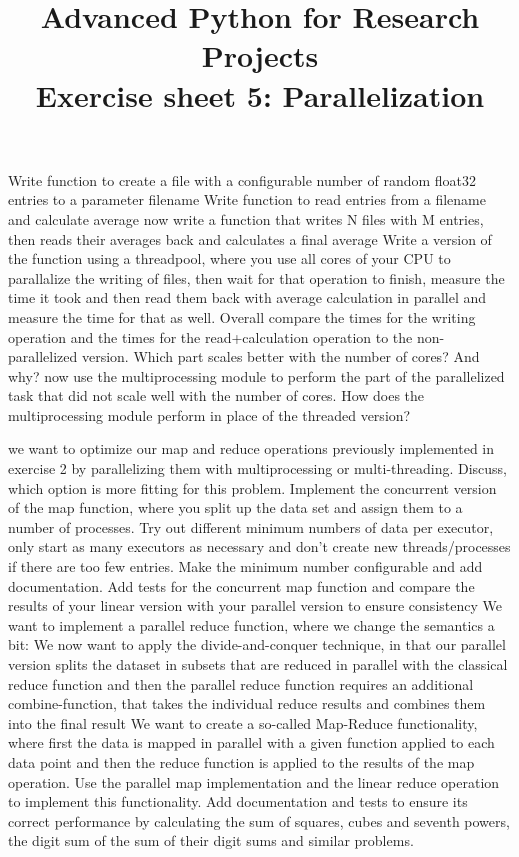 \documentclass[]{erlangen-problemset}
\title{{\Large Advanced Python for Research Projects} \\[0.3cm] 
Exercise sheet 5: Parallelization}
\begin{document}


\begin{problem}[title={Parallelization in python}]
\noindent
\Question Write function to create a file with a configurable number of random float32 entries to a parameter filename
\Question Write function to read entries from a filename and calculate average
\Question now write a function that writes N files with M entries, then reads their averages back and calculates a final average
\Question Write a version of the function using a threadpool, where you use all cores of your CPU to parallalize the writing of files, then wait for that operation to finish, measure the time it took and then read them back with average calculation in parallel and measure the time for that as well. 
Overall compare the times for the writing operation and the times for the read+calculation operation to the non-parallelized version. Which part scales better with the number of cores? And why?
\Question now use the multiprocessing module to perform the part of the parallelized task that did not scale well with the number of cores.
\Question How does the multiprocessing module perform in place of the threaded version?
\end{problem}


\begin{problem}[title={Parallel operators}]
\noindent
\Question we want to optimize our map and reduce operations previously implemented in exercise 2 by parallelizing them with multiprocessing or multi-threading. Discuss, which option is more fitting for this problem.
\Question Implement the concurrent version of the map function, where you split up the data set and assign them to a number of processes. Try out different minimum numbers of data per executor, only start as many executors as necessary and don't create new threads/processes if there are too few entries. Make the minimum number configurable and add documentation. 
\Question Add tests for the concurrent map function and compare the results of your linear version with your parallel version to ensure consistency
\Question We want to implement a parallel reduce function, where we change the semantics a bit:
We now want to apply the divide-and-conquer technique, in that our parallel version splits the dataset in subsets that are reduced in parallel with the classical reduce function and then the parallel reduce function requires an additional combine-function, that takes the individual reduce results and combines them into the final result
\Question We want to create a so-called Map-Reduce functionality, where first the data is mapped in parallel with a given function applied to each data point and then the reduce function is applied to the results of the map operation. Use the parallel map implementation and the linear reduce operation to implement this functionality. Add documentation and tests to ensure its correct performance by calculating the sum of squares, cubes and seventh powers, the digit sum of the sum of their digit sums and similar problems.
\end{problem}
\end{document}
